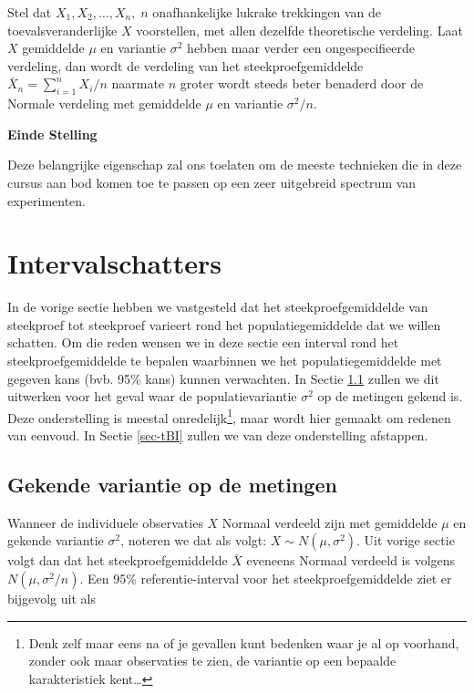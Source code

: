 \documentclass[
  dutch,
  letterpaper,
  12pt]{book}
\theoremstyle{definition}
\theoremstyle{definition}
\theoremstyle{definition}
\theoremstyle{remark}
\begin{document}
Stel dat \(X_1, X_2, \dots, X_n, \; n\) onafhankelijke lukrake
trekkingen van de toevalsveranderlijke \(X\) voorstellen, met allen
dezelfde theoretische verdeling. Laat \(X\) gemiddelde \(\mu\) en
variantie \(\sigma^2\) hebben maar verder een ongespecifieerde
verdeling, dan wordt de verdeling van het steekproefgemiddelde
\(\bar{X}_n = {\sum_{i=1}^{n} X_i}/{n}\) naarmate \(n\) groter wordt
steeds beter benaderd door de Normale verdeling met gemiddelde \(\mu\)
en variantie \(\sigma^2/n.\)

\textbf{Einde Stelling}

Deze belangrijke eigenschap zal ons toelaten om de meeste technieken die
in deze cursus aan bod komen toe te passen op een zeer uitgebreid
spectrum van experimenten.

\section{Intervalschatters}\label{intervalschatters}

In de vorige sectie hebben we vastgesteld dat het steekproefgemiddelde
van steekproef tot steekproef varieert rond het populatiegemiddelde dat
we willen schatten. Om die reden wensen we in deze sectie een interval
rond het steekproefgemiddelde te bepalen waarbinnen we het
populatiegemiddelde met gegeven kans (bvb. 95\% kans) kunnen verwachten.
In Sectie \ref{sec-bigek} zullen we dit uitwerken voor het geval waar de
populatievariantie \(\sigma^2\) op de metingen gekend is. Deze
onderstelling is meestal onredelijk\footnote{Denk zelf maar eens na of
  je gevallen kunt bedenken waar je al op voorhand, zonder ook maar
  observaties te zien, de variantie op een bepaalde karakteristiek
  kent\ldots{}}, maar wordt hier gemaakt om redenen van eenvoud. In
Sectie \ref{sec-tBI} zullen we van deze onderstelling afstappen.

\subsection{Gekende variantie op de metingen}\label{sec-bigek}

Wanneer de individuele observaties \(X\) Normaal verdeeld zijn met
gemiddelde \(\mu\) en gekende variantie \(\sigma^2\), noteren we dat als
volgt: \(X\sim N(\mu,\sigma^2)\). Uit vorige sectie volgt dan dat het
steekproefgemiddelde \(\bar{X}\) eveneens Normaal verdeeld is volgens
\(N(\mu,\sigma^2/n)\). Een 95\% referentie-interval voor het
steekproefgemiddelde ziet er bijgevolg uit als
\end{document}
